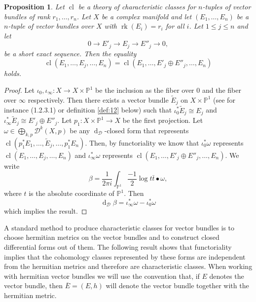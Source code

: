 \documentclass[10pt,twoside]{article}
\numberwithin{equation}{section}
\theoremstyle{plain}
\newtheorem{proposition}[equation]{Proposition}
\theoremstyle{definition}
\DeclareMathOperator{\dd}{d}
\DeclareMathOperator{\cl}{cl}
\DeclareMathOperator{\rk}{rk}
\begin{document}
\begin{proposition} \label{prop:12}
  Let $\cl$ be a
  theory of characteristic classes
  for $n$-tuples of vector bundles of rank $r_{1},\dots ,r_{n}$. Let
  $X$ be a complex manifold and let 
  $(E_{1},\dots ,E_{n})$ be a $n$-tuple of vector bundles over $X$ with
  $\rk(E_{i})=r_{i}$ for all $i$. Let $1\le j\le n$ and let
  \begin{displaymath}
    0\longrightarrow E'_{j}\longrightarrow  E_{j}
    \longrightarrow E''_{j}\longrightarrow 0,
  \end{displaymath}
  be a short exact sequence. Then 
  the equality
    \begin{displaymath}
      \cl(E_{1},\dots, E_{j},\dots ,E_{n})=
      \cl(E_{1},\dots, E'_{j}\oplus E''_{j},\dots  ,E_{n}) 
    \end{displaymath}
    holds.
\end{proposition}
\begin{proof}
  Let $\iota_{0},\iota_{\infty}\colon X\longrightarrow X\times
  \mathbb{P}^{1}$ be the inclusion as the fiber over $0$ and the fiber
  over $\infty$ respectively. Then there exists a vector bundle
  $\widetilde E_{j}$ on $X\times \mathbb{P}^{1}$ (see for instance
  \cite{GilletSoule:vbhm}  (1.2.3.1) or definition \ref{def:12} below)
  such that 
  $\iota^{\ast}_{0}\widetilde E_{j}\cong E_{j}$ and
  $\iota^{\ast}_{\infty}\widetilde E_{j}\cong E'_{j}\oplus E''_{j}$. Let
  $p_{1}\colon X\times 
  \mathbb{P}^{1}\longrightarrow X$ be the first projection. Let
  $\omega\in \bigoplus _{k,p}\mathcal{D}^{k}(X,p)$ be any
  $\dd_{\mathcal{D}}$-closed form
  that represents  $\cl(p_{1}^{\ast}E_{1},\dots,
  \widetilde E_{j},\dots ,p_{1}^{\ast} E_{n})$. Then, by functoriality
  we know that $\iota_{0}^{\ast}\omega $ represents $ \cl(E_{1},\dots,
  E_{j},\dots ,E_{n}) $ and  $\iota_{\infty}^{\ast}\omega $ represents
  $\cl(E_{1},\dots, E'_{j}\oplus E''_{j},\dots  ,E_{n})$. We write
  \begin{displaymath}
    \beta =\frac{1}{2\pi i}\int_{\mathbb{P}^{1}}
    \frac{-1}{2}\log t\bar t\bullet \omega,
  \end{displaymath}
  where $t$ is the absolute coordinate of $\mathbb{P}^{1}$. Then
  \begin{displaymath}
    \dd_{\mathcal{D}}\beta 
    = \iota_{\infty}^{\ast}\omega -\iota^{\ast}_{0}\omega 
  \end{displaymath}
  which implies the result.
\end{proof}

A standard method to produce characteristic classes for vector bundles
is to choose hermitian metrics on the vector bundles and to construct
closed differential forms out of them. The following result shows that
functoriality implies that the cohomology classes represented by these
forms are independent from the hermitian metrics and therefore are
characteristic classes. When working with hermitian vector bundles we
will use the convention that, if $E$ denotes the vector bundle, then
$\overline E=(E,h)$ will denote the vector bundle together with the
hermitian metric.
\end{document}

